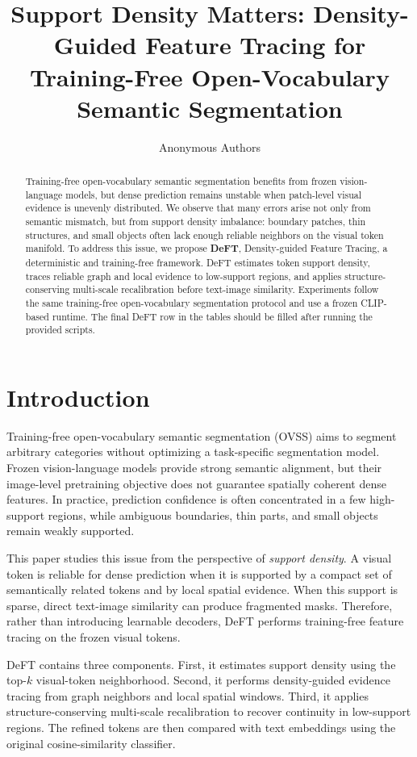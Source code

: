 \documentclass[letterpaper]{article}
\title{Support Density Matters: Density-Guided Feature Tracing for Training-Free Open-Vocabulary Semantic Segmentation}
\author{Anonymous Authors}
\begin{document}
\maketitle

\begin{abstract}
Training-free open-vocabulary semantic segmentation benefits from frozen
vision-language models, but dense prediction remains unstable when patch-level
visual evidence is unevenly distributed. We observe that many errors arise not
only from semantic mismatch, but from support density imbalance: boundary
patches, thin structures, and small objects often lack enough reliable
neighbors on the visual token manifold. To address this issue, we propose
\textbf{DeFT}, Density-guided Feature Tracing, a deterministic and
training-free framework. DeFT estimates token support density, traces reliable
graph and local evidence to low-support regions, and applies
structure-conserving multi-scale recalibration before text-image similarity.
Experiments follow the same training-free open-vocabulary segmentation
protocol and use a frozen CLIP-based runtime. The final DeFT row in the tables
should be filled after running the provided scripts.
\end{abstract}

\section{Introduction}

Training-free open-vocabulary semantic segmentation (OVSS) aims to segment
arbitrary categories without optimizing a task-specific segmentation model.
Frozen vision-language models provide strong semantic alignment, but their
image-level pretraining objective does not guarantee spatially coherent dense
features. In practice, prediction confidence is often concentrated in a few
high-support regions, while ambiguous boundaries, thin parts, and small
objects remain weakly supported.

This paper studies this issue from the perspective of \emph{support density}.
A visual token is reliable for dense prediction when it is supported by a
compact set of semantically related tokens and by local spatial evidence. When
this support is sparse, direct text-image similarity can produce fragmented
masks. Therefore, rather than introducing learnable decoders, DeFT performs
training-free feature tracing on the frozen visual tokens.

DeFT contains three components. First, it estimates support density using the
top-$k$ visual-token neighborhood. Second, it performs density-guided evidence
tracing from graph neighbors and local spatial windows. Third, it applies
structure-conserving multi-scale recalibration to recover continuity in
low-support regions. The refined tokens are then compared with text embeddings
using the original cosine-similarity classifier.
\end{document}
